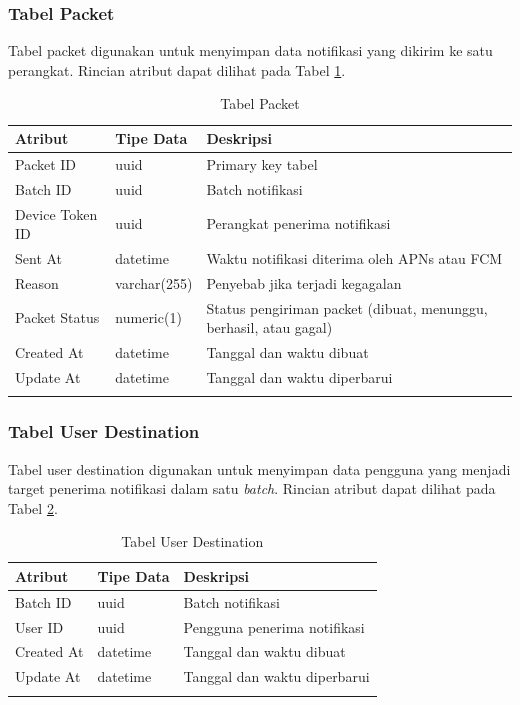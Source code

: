 \subsubsection{Tabel Packet}
\par Tabel packet digunakan untuk menyimpan data notifikasi yang dikirim ke satu perangkat. Rincian atribut dapat dilihat pada Tabel \ref{tabel_packet}.
\begin{longtable}{|p{2cm}|p{2.5cm}|p{4.5cm}|}
    \hline
    \textbf{Atribut} & \textbf{Tipe Data} & \textbf{Deskripsi} \\ \hline
    Packet ID & uuid & Primary key tabel \\ \hline
    Batch ID & uuid & Batch notifikasi \\ \hline
    Device Token ID & uuid & Perangkat penerima notifikasi \\ \hline
    Sent At & datetime & Waktu notifikasi diterima oleh APNs atau FCM \\ \hline
    Reason & varchar(255) & Penyebab jika terjadi kegagalan \\ \hline
    Packet Status & numeric(1) & Status pengiriman packet (dibuat, menunggu, berhasil, atau gagal) \\ \hline
    Created At & datetime & Tanggal dan waktu dibuat \\ \hline
    Update At & datetime & Tanggal dan waktu diperbarui \\ \hline
    \caption{Tabel Packet}
    \label{tabel_packet}
\end{longtable}

\subsubsection{Tabel User Destination}
\par Tabel user destination digunakan untuk menyimpan data pengguna yang menjadi target penerima notifikasi dalam satu \textit{batch}. Rincian atribut dapat dilihat pada Tabel \ref{tabel_user_destination}.
\begin{longtable}{|p{2cm}|p{2.5cm}|p{4.5cm}|}
    \hline
    \textbf{Atribut} & \textbf{Tipe Data} & \textbf{Deskripsi} \\ \hline
    Batch ID & uuid & Batch notifikasi \\ \hline
    User ID & uuid & Pengguna penerima notifikasi \\ \hline
    Created At & datetime & Tanggal dan waktu dibuat \\ \hline
    Update At & datetime & Tanggal dan waktu diperbarui \\ \hline
    \caption{Tabel User Destination}
    \label{tabel_user_destination}
\end{longtable}

